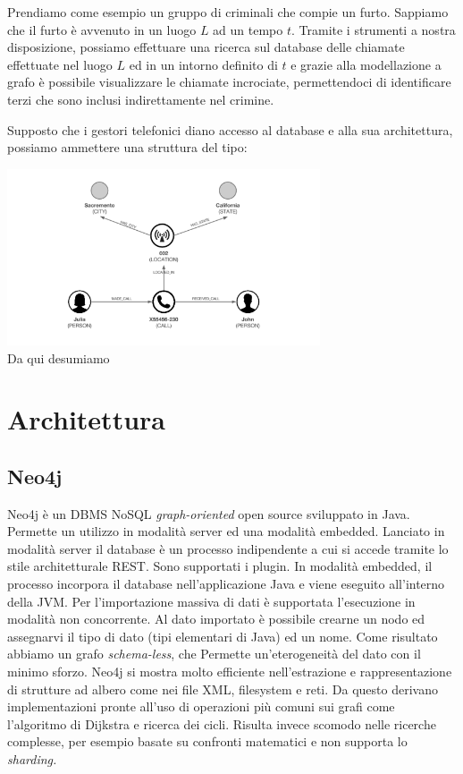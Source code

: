 Prendiamo come esempio un gruppo di criminali che compie un furto. Sappiamo che il furto è avvenuto
in un luogo $L$ ad un tempo $t$. Tramite i strumenti a nostra disposizione, possiamo
effettuare una ricerca sul database delle chiamate effettuate nel luogo $L$ ed in un intorno definito di $t$ e
grazie alla modellazione a grafo è possibile visualizzare le chiamate incrociate, permettendoci di
identificare terzi che sono inclusi indirettamente nel crimine. 

Supposto che i gestori telefonici diano accesso al database e alla sua architettura, possiamo ammettere
una struttura del tipo:

\includegraphics[width=350px, keepaspectratio]{er.png}\\[1cm]

Da qui desumiamo 

\pagebreak
\section{Architettura}

    \subsection{Neo4j}
    Neo4j è un DBMS NoSQL \textit{graph-oriented} open source sviluppato in Java.
    Permette un utilizzo in modalità server ed una modalità embedded.
    Lanciato in modalità server il database è un processo indipendente a cui
    si accede tramite lo stile architetturale REST. Sono supportati i plugin. 
    In modalità embedded, il processo incorpora il database nell'applicazione 
    Java e viene eseguito all'interno della JVM. Per l'importazione massiva di dati 
    è supportata l'esecuzione in modalità non concorrente. Al dato importato 
    è possibile crearne un nodo ed assegnarvi il tipo di dato (tipi elementari 
    di Java) ed un nome. Come risultato abbiamo un grafo \textit{schema-less}, che Permette 
    un'eterogeneità del dato con il minimo sforzo. Neo4j si mostra
    molto efficiente nell'estrazione e rappresentazione di strutture
    ad albero come nei file XML, filesystem e reti. Da questo derivano
    implementazioni pronte all'uso di operazioni più comuni sui grafi
    come l'algoritmo di Dijkstra e ricerca dei cicli. Risulta invece scomodo
    nelle ricerche complesse, per esempio basate su confronti matematici e non
    supporta lo \textit{sharding.}

